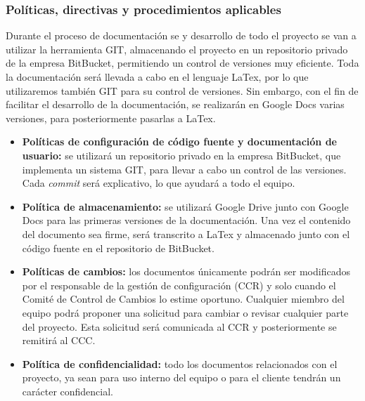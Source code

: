 \subsubsection{Políticas, directivas y procedimientos aplicables}
\par Durante el proceso de documentación se y desarrollo de todo el proyecto se van a utilizar la herramienta GIT, almacenando el proyecto en un repositorio privado de la empresa BitBucket, permitiendo un control de versiones muy eficiente. Toda la documentación será llevada a cabo en el lenguaje LaTex, por lo que utilizaremos también GIT para su control de versiones. Sin embargo, con el fin de facilitar el desarrollo de la documentación, se realizarán en Google Docs varias versiones, para posteriormente pasarlas a LaTex.

\begin{itemize}[-]
  \item \textbf{Políticas de configuración de código fuente y documentación de usuario:} se utilizará un repositorio privado en la empresa BitBucket, que implementa un sistema GIT, para llevar a cabo un control de las versiones. Cada \textit{commit} será explicativo, lo que ayudará a todo el equipo.
  \item \textbf{Política de almacenamiento:} se utilizará Google Drive junto con Google Docs para las primeras versiones de la documentación. Una vez el contenido del documento sea firme, será transcrito a LaTex y almacenado junto con el código fuente en el repositorio de BitBucket.
  \item \textbf{Políticas de cambios:} los documentos únicamente podrán ser modificados por el responsable de la gestión de configuración (CCR) y solo cuando el Comité de Control de Cambios lo estime oportuno. Cualquier miembro del equipo podrá proponer una solicitud para cambiar o revisar cualquier parte del proyecto. Esta solicitud será comunicada al CCR y posteriormente se remitirá al CCC.
  \item \textbf{Política de confidencialidad:} todo los documentos relacionados con el proyecto, ya sean para uso interno del equipo o para el cliente tendrán un carácter confidencial.
\end{itemize}
